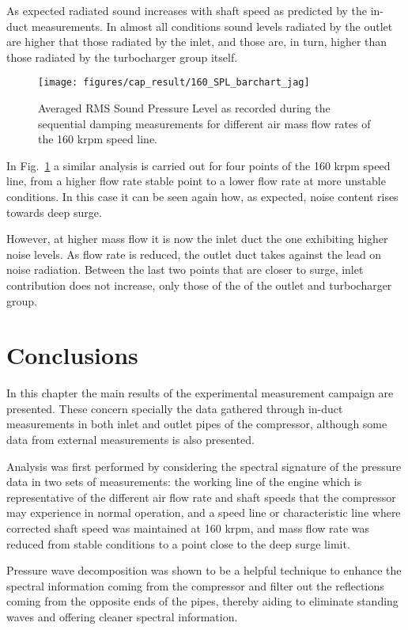 As expected radiated sound increases with shaft speed as predicted by the in-duct measurements. In almost all conditions sound levels radiated by the outlet are higher that those radiated by the inlet, and those are, in turn, higher than those radiated by the turbocharger group itself.

\begin{figure}[tbh!]
\centering
\texttt{[image: figures/cap\_result/160\_SPL\_barchart\_jag]}
\caption[Averaged radiated SPL along the 160 krpm line]{Averaged RMS Sound Pressure Level as recorded during the sequential damping measurements for different air mass flow rates of the 160 krpm speed line.}
\label{fig:result_spl_radiated_comp_bar_160}
\end{figure}

In Fig.~\ref{fig:result_spl_radiated_comp_bar_160} a similar analysis is carried out for four points of the 160 krpm speed line, from a higher flow rate stable point to a lower flow rate at more unstable conditions. In this case it can be seen again how, as expected, noise content rises towards deep surge.

However, at higher mass flow it is now the inlet duct the one exhibiting higher noise levels. As flow rate is reduced, the outlet duct takes against the lead on noise radiation. Between the last two points that are closer to surge, inlet contribution does not increase, only those of the of the outlet and turbocharger group.

\section{Conclusions}

In this chapter the main results of the experimental measurement campaign are presented. These concern specially the data gathered through in-duct measurements in both inlet and outlet pipes of the compressor, although some data from external measurements is also presented.

Analysis was first performed by considering the spectral signature of the pressure data in two sets of measurements: the working line of the engine which is representative of the different air flow rate and shaft speeds that the compressor may experience in normal operation, and a speed line or characteristic line where corrected shaft speed was maintained at 160 krpm, and mass flow rate was reduced from stable conditions to a point close to the deep surge limit.

Pressure wave decomposition was shown to be a helpful technique to enhance the spectral information coming from the compressor and filter out the reflections coming from the opposite ends of the pipes, thereby aiding to eliminate standing waves and offering  cleaner spectral information.

